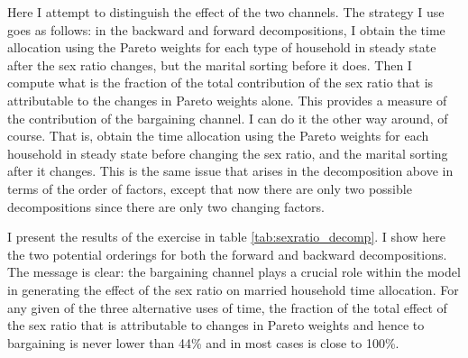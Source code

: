 \documentclass[12pt]{article}
\begin{document}
Here I attempt to distinguish the effect of the two channels. The strategy I use goes as follows: in the backward and forward decompositions, I obtain the time allocation using the Pareto weights for each type of household in steady state after the sex ratio changes, but the marital sorting before it does. Then I compute what is the fraction of the total contribution of the sex ratio that is attributable to the changes in Pareto weights alone. This provides a measure of the contribution of the bargaining channel. I can do it the other way around, of course. That is, obtain the time allocation using the Pareto weights for each household in steady state before changing the sex ratio, and the marital sorting after it changes. This is the same issue that arises in the decomposition above in terms of the order of factors, except that now there are only two possible decompositions since there are only two changing factors.

I present the results of the exercise in table \ref{tab:sexratio_decomp}. I show here the two potential orderings for both the forward and backward decompositions. The message is clear: the bargaining channel plays a crucial role within the model in generating the effect of the sex ratio on married household time allocation. For any given of the three alternative uses of time, the fraction of the total effect of the sex ratio that is attributable to changes in Pareto weights and hence to bargaining is never lower than 44\% and in most cases is close to 100\%.
\end{document}
